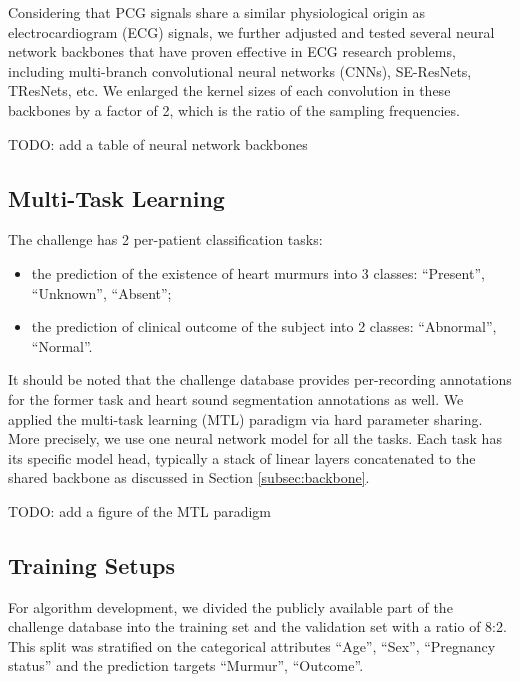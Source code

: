 
Considering that PCG signals share a similar physiological origin as electrocardiogram (ECG) signals, we further adjusted and tested several neural network backbones \cite{Kang_2022_cinc2021_iop} that have proven effective in ECG research problems, including multi-branch convolutional neural networks (CNNs), SE-ResNets, TResNets, etc. We enlarged the kernel sizes of each convolution in these backbones by a factor of 2, which is the ratio of the sampling frequencies.

TODO: add a table of neural network backbones

\subsection{Multi-Task Learning}
\label{subsec:mtl}

The challenge \cite{cinc2022} has 2 per-patient classification tasks:
\begin{itemize}
    \item the prediction of the existence of heart murmurs into 3 classes: ``Present'', ``Unknown'', ``Absent'';
    \item the prediction of clinical outcome of the subject into 2 classes: ``Abnormal'', ``Normal''.
\end{itemize}

It should be noted that the challenge database \cite{Oliveira_2021_CirCor} provides per-recording annotations for the former task and heart sound segmentation annotations as well. We applied the multi-task learning (MTL) paradigm \cite{Caruana_1997_mtl} via hard parameter sharing. More precisely, we use one neural network model for all the tasks. Each task has its specific model head, typically a stack of linear layers concatenated to the shared backbone as discussed in Section \ref{subsec:backbone}.

TODO: add a figure of the MTL paradigm

\subsection{Training Setups}
\label{subsec:training}

For algorithm development, we divided the publicly available part of the challenge database into the training set and the validation set with a ratio of 8:2. This split was stratified on the categorical attributes ``Age'', ``Sex'', ``Pregnancy status'' and the prediction targets ``Murmur'', ``Outcome''.

